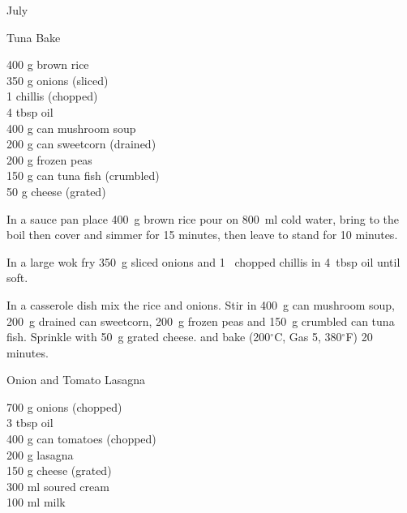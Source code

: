 \begin{menu}{July}
    \begin{recipe}{2}{Tuna Bake}%
		\begin{ingredients}
		400 g brown rice  \\
	350 g onions (sliced) \\
	1  chillis (chopped) \\
	4 tbsp oil  \\
	400 g can mushroom soup  \\
	200 g can sweetcorn (drained) \\
	200 g frozen peas  \\
	150 g can tuna fish (crumbled) \\
	50 g cheese (grated) \\
	
		\end{ingredients}
	
	
    \begin{instructions}
    \item 
    In a
    sauce pan
    place
    400~g  brown rice
    pour on
    800~ml  cold water,
    bring to the boil then cover and simmer for 15 minutes,
    then leave to stand for 10 minutes.
  \item 
        In a large wok fry
        350~g sliced onions
        and
        1~ chopped chillis
        in
        4~tbsp  oil
        until soft.
      \item 
        In a casserole dish mix
        the rice and onions.
        Stir in
        400~g  can mushroom soup,
        200~g drained can sweetcorn,
        200~g  frozen peas
        and
        150~g crumbled can tuna fish.
        Sprinkle with
        50~g grated cheese.
        and
        bake (200$^{\circ}$C, Gas 5, 380$^{\circ}$F) 20 minutes.
      
    \end{instructions}
    \end{recipe}%
  
    \begin{recipe}{2}{Onion and Tomato Lasagna}%
		\begin{ingredients}
		700 g onions (chopped) \\
	3 tbsp oil  \\
	400 g can tomatoes (chopped) \\
	200 g lasagna  \\
	150 g cheese (grated) \\
	300 ml soured cream  \\
	100 ml milk  \\
	

\end{ingredients}
\end{recipe}
\end{menu}

